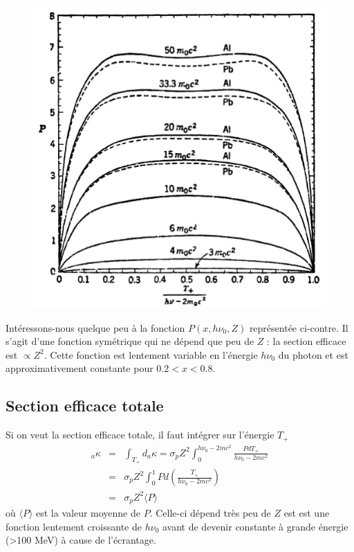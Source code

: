 	\begin{figure}
	\vspace{-5mm}
	\includegraphics[scale=0.24]{ch4/image13}
	\end{figure}
Intéressons-nous quelque peu à la fonction $P(x,h\nu_0,Z)$ représentée ci-contre. Il s'agit d'une
fonction symétrique qui ne dépend que peu de $Z$ : la section efficace est $\propto Z^2$. Cette 
fonction est lentement variable en l'énergie $h\nu_0$ du photon et est approximativement constante
pour $0.2<x<0.8$.

\newpage
\subsection{Section efficace totale}%
Si on veut la section efficace totale, il faut intégrer sur l'énergie $T_+$
\begin{eqnarray}
{}_a\kappa&=&\int_{T_+}d{}_a\kappa=\sigma_pZ^2\int_0^{h\nu_0-2mc^2}\frac{PdT_+}{h\nu_0-2mc^2}\\
&=&\sigma_pZ^2\int_0^{1}Pd\left(\frac{T_+}{h\nu_0-2mc^2}\right)\\
&=&\sigma_pZ^2\langle P\rangle
\end{eqnarray}
où $\langle P\rangle$ est la valeur moyenne de $P$. Celle-ci dépend très peu de $Z$ est est 
une fonction lentement croissante de $h\nu_0$ avant de devenir constante à grande énergie 
(>100 MeV) à cause de l'écrantage.




